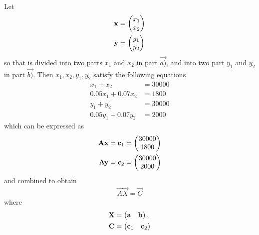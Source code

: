 Let 
\begin{align}
	\mathbf{x} &= \begin{pmatrix} x_1 \\x_2\end{pmatrix}
	\\
	\mathbf{y} &= \begin{pmatrix} y_1 \\y_2\end{pmatrix}
\end{align}
so that 
 is divided into two parts $x_1$ and $x_2$ in part $\vec{a)}$, and into two part $y_1$ and $y_2$ in part $\vec{b)}$. Then $x_1,x_2,y_1,y_2$ satisfy the  following equations
\begin{align}
  x_1+x_2 &= 30000\label{eq:solutions/matrix/291}\\
  0.05x_1+0.07x_2 &= 1800\label{eq:solutions/matrix/292}\\
  y_1+y_2 &= 30000\label{eq:solutions/matrix/293}\\
  0.05y_1+0.07y_2 &= 2000\label{eq:solutions/matrix/294}
\end{align}
which can be expressed as 
\begin{align}
	\mathbf{A} \mathbf{x} = \mathbf{c}_1=\begin{pmatrix} 30000 \\ 1800\end{pmatrix} \\
	\mathbf{A} \mathbf{y} = \mathbf{c}_2=\begin{pmatrix} 30000 \\ 2000\end{pmatrix}
\end{align}
and combined to obtain 
\begin{align}
	\vec{A} \vec{X} = \vec{C}
\end{align}
where
\begin{align}
	\mathbf{X} &= \begin{pmatrix} \mathbf{a} & \mathbf{b}\end{pmatrix},
	\\
	\mathbf{C} &= \begin{pmatrix}  \mathbf{c}_1 & \mathbf{c}_2\end{pmatrix} 
\end{align}

